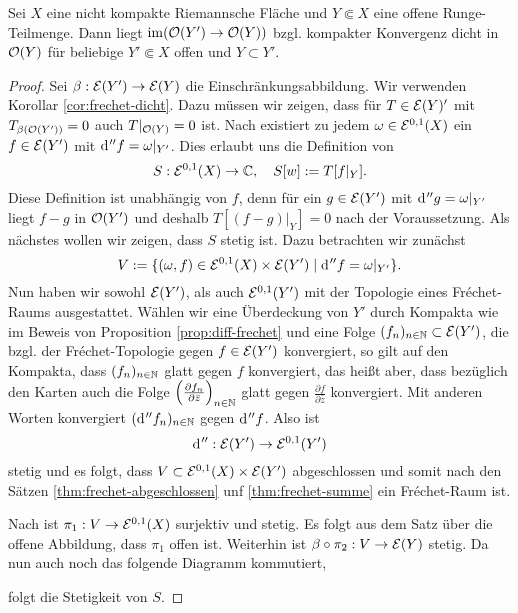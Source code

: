 \begin{thm}
  \label{thm:runge-dicht}
  Sei $X$ eine nicht kompakte Riemannsche Fläche und $Y \Subset X$
  eine offene Runge-Teilmenge. 
  Dann liegt $\operatorname{im}( \mathcal{O}(Y') \rightarrow \mathcal{O}(Y))$ bzgl. kompakter Konvergenz dicht in $\mathcal{O}(Y)$ für beliebige $Y' \Subset X$
  offen und $Y \subset Y'$.
\end{thm}

\begin{proof}
  Sei $\beta: \mathcal{E}(Y') \rightarrow \mathcal{E}(Y)$ die Einschränkungsabbildung. Wir
  verwenden Korollar \ref{cor:frechet-dicht}. Dazu müssen wir zeigen, dass für $T \in
  \mathcal{E}(Y)'$ mit $T_{\beta(\mathcal{O}(Y'))} = 0$ auch $T|_{\mathcal{O}(Y)}
  = 0$ ist. 
  Nach \cite[Kor. 14.16]{For} existiert zu jedem $\omega \in \mathcal{E}^{0,1}(X)$ ein $f \in
  \mathcal{E}(Y')$ mit $\d[''f] = \omega|_{Y'}$. 
  Dies erlaubt uns die Definition von
  \[
  S: \mathcal{E}^{0,1}(X) \rightarrow \mathbb{C}, \quad S[w] := T[f|_Y].
  \]
  Diese Definition ist unabhängig von $f$, denn für
  ein $g \in \mathcal{E}(Y')$ mit $\d[''g] = \omega|_{Y'}$ liegt $f-g$
  in $\mathcal{O}(Y')$ und deshalb $T[(f-g)|_Y] = 0$ nach der Voraussetzung.
  Als nächstes wollen wir zeigen, dass $S$ stetig ist. 
  Dazu betrachten wir zunächst
  \[
  V := \{ (\omega, f) \in \diff^{0,1}(X) \times \diff(Y') \mid \d[''f] = \omega|_{Y'} \}.
  \]
  Nun haben wir
  sowohl $\mathcal{E}(Y')$, als auch $\mathcal{E}^{0,1}(Y')$ mit der Topologie
  eines Fr\'echet-Raums ausgestattet. Wählen wir eine Überdeckung von
  $Y'$ durch Kompakta wie im Beweis von Proposition
  \ref{prop:diff-frechet} und eine Folge $(f_n)_{n\in \mathbb{N}} \subset
  \mathcal{E}(Y')$, die bzgl. der Fr\'echet-Topologie gegen \break$f \in \mathcal{E}(Y')$
  konvergiert, so gilt auf den Kompakta, dass $(f_n)_{n\in \mathbb{N}}$ glatt
  gegen $f$ konvergiert, das heißt aber, dass bezüglich den Karten
  auch die Folge $\left(\frac{\partial f_n}{\partial \bar z} \right
  )_{n \in\mathbb{N}}$ glatt gegen $\frac{\partial f}{\partial \bar
      z}$ konvergiert. Mit anderen Worten konvergiert
    $(\d[''f_n])_{n\in \N}$ gegen $\d[''f]$. Also ist 
    \[
    \d['']: \diff(Y') \ra \diff^{0,1}(Y')
    \]
    stetig und es folgt, dass $V
  \subset \mathcal{E}^{0,1}(X) \times \mathcal{E}(Y')$ abgeschlossen und somit
  nach den Sätzen \ref{thm:frechet-abgeschlossen} unf \ref{thm:frechet-summe} ein
  Fr\'echet-Raum ist.
  
  Nach \cite[Kor. 14.16]{For} ist $\pi_1: V \rightarrow \mathcal{E}^{0,1}(X)$
  surjektiv und stetig. Es folgt aus dem Satz über die offene
  Abbildung, dass $\pi_1$ offen ist.
  Weiterhin ist $\beta \circ \pi_2 : V \rightarrow \mathcal{E}(Y)$ stetig. Da nun
  auch noch das folgende Diagramm kommutiert,
  \begin{center}
  \end{center}
  folgt die Stetigkeit von $S$.


\end{proof}
